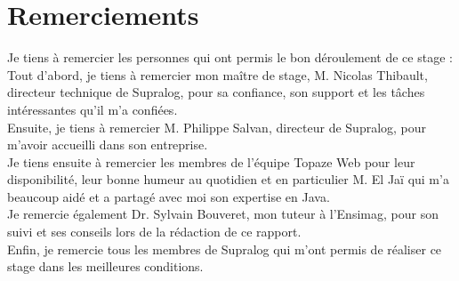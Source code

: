 \newpage
\section*{Remerciements}

Je tiens à remercier les personnes qui ont permis le bon déroulement de ce stage : \\

Tout d'abord, je tiens à remercier mon ma\^itre de stage, M. Nicolas Thibault, directeur technique de Supralog, pour sa confiance, son support et les tâches intéressantes qu'il m'a confiées.\\

Ensuite, je tiens à remercier M. Philippe Salvan, directeur de Supralog, pour m'avoir accueilli dans son entreprise.\\

Je tiens ensuite à remercier les membres de l'équipe Topaze Web pour leur disponibilité, leur bonne humeur au quotidien et en particulier M. El Jaï qui m'a beaucoup aidé et a partagé avec moi son expertise en Java.\\

Je remercie également Dr. Sylvain Bouveret, mon tuteur à l'Ensimag, pour son suivi et ses conseils lors de la rédaction de ce rapport.\\

Enfin, je remercie tous les membres de Supralog qui m'ont permis de réaliser ce stage dans les meilleures conditions.
